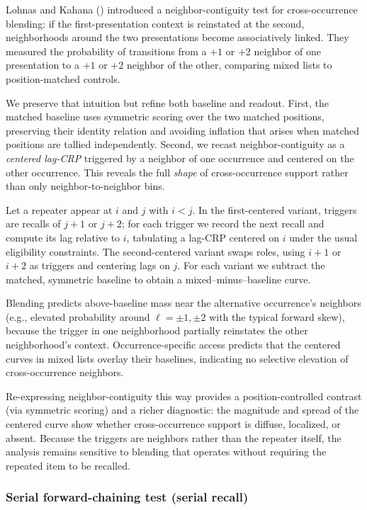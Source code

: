 \documentclass[
  man,
  floatsintext,
  longtable,
  nolmodern,
  notxfonts,
  notimes,
  draftfirst,
  colorlinks=true,linkcolor=blue,citecolor=blue,urlcolor=blue]{apa7}
\begin{document}
Lohnas and Kahana () introduced
a neighbor-contiguity test for cross-occurrence blending: if the
first-presentation context is reinstated at the second, neighborhoods
around the two presentations become associatively linked. They measured
the probability of transitions from a \(+1\) or \(+2\) neighbor of one
presentation to a \(+1\) or \(+2\) neighbor of the other, comparing
mixed lists to position-matched controls.

We preserve that intuition but refine both baseline and readout. First,
the matched baseline uses symmetric scoring over the two matched
positions, preserving their identity relation and avoiding inflation
that arises when matched positions are tallied independently. Second, we
recast neighbor-contiguity as a \emph{centered lag-CRP} triggered by a
neighbor of one occurrence and centered on the other occurrence. This
reveals the full \emph{shape} of cross-occurrence support rather than
only neighbor-to-neighbor bins.

Let a repeater appear at \(i\) and \(j\) with \(i<j\). In the
first-centered variant, triggers are recalls of \(j{+}1\) or \(j{+}2\);
for each trigger we record the next recall and compute its lag relative
to \(i\), tabulating a lag-CRP centered on \(i\) under the usual
eligibility constraints. The second-centered variant swaps roles, using
\(i{+}1\) or \(i{+}2\) as triggers and centering lags on \(j\). For each
variant we subtract the matched, symmetric baseline to obtain a
mixed--minus--baseline curve.

Blending predicts above-baseline mass near the alternative occurrence's
neighbors (e.g., elevated probability around \(\ell=\pm1,\pm2\) with the
typical forward skew), because the trigger in one neighborhood partially
reinstates the other neighborhood's context. Occurrence-specific access
predicts that the centered curves in mixed lists overlay their
baselines, indicating no selective elevation of cross-occurrence
neighbors.

Re-expressing neighbor-contiguity this way provides a
position-controlled contrast (via symmetric scoring) and a richer
diagnostic: the magnitude and spread of the centered curve show whether
cross-occurrence support is diffuse, localized, or absent. Because the
triggers are neighbors rather than the repeater itself, the analysis
remains sensitive to blending that operates without requiring the
repeated item to be recalled.

\subsubsection{Serial forward-chaining test (serial
recall)}\label{serial-forward-chaining-test-serial-recall}
\end{document}
